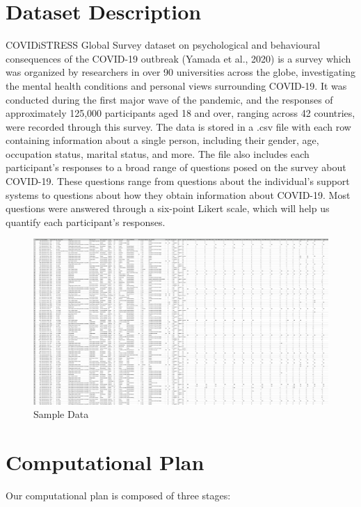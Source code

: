 \documentclass[fontsize=11pt]{article}
\begin{document}
    \section*{Dataset Description}

    COVIDiSTRESS Global Survey dataset on psychological and behavioural consequences of the COVID-19 outbreak (Yamada et al., 2020) is a survey which was organized by researchers in over 90 universities across the globe, investigating the mental health conditions and personal views surrounding COVID-19.
    It was conducted during the first major wave of the pandemic, and the responses of approximately 125,000 participants aged 18 and over, ranging across 42 countries, were recorded through this survey.
    The data is stored in a .csv file with each row containing information about a single person, including their gender, age, occupation status, marital status, and more.
    The file also includes each participant's responses to a broad range of questions posed on the survey about COVID-19.
    These questions range from questions about the individual’s support systems to questions about how they obtain information about COVID-19.
    Most questions were answered through a six-point Likert scale, which will help us quantify each participant’s responses.

    \begin{figure}
        \centering
        \includegraphics[width=\textwidth]{img/SampleData}
        \caption{Sample Data}
        \label{fig:my_label}
    \end{figure}

    \section*{Computational Plan}

    Our computational plan is composed of three stages:
\end{document}
